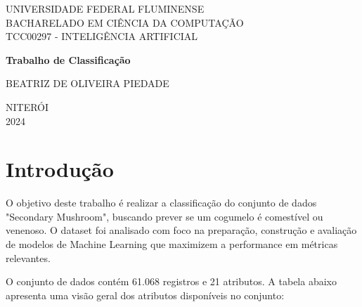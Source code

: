 \documentclass[12pt,a4paper]{article}
\begin{document}
	
\begin{titlepage}
	\centering
	\vspace{2cm}
	
	{UNIVERSIDADE FEDERAL FLUMINENSE} \\ [0.1cm]
	{BACHARELADO EM CIÊNCIA DA COMPUTAÇÃO} \\ [0.1cm]
	{TCC00297 - INTELIGÊNCIA ARTIFICIAL}
	
	\vfill
	
	{\Large \bfseries Trabalho de Classificação}
	
	\vfill
	
	{BEATRIZ DE OLIVEIRA PIEDADE}
	
	\vfill
	{NITERÓI} \\
	{2024}
\end{titlepage}

\tableofcontents

\newpage
\section{Introdução} 

\quad\space O objetivo deste trabalho é realizar a classificação do conjunto de dados "Secondary Mushroom", buscando prever se um cogumelo é comestível ou venenoso. O dataset foi analisado com foco na preparação, construção e avaliação de modelos de Machine Learning que maximizem a performance em métricas relevantes.

O conjunto de dados contém 61.068 registros e 21 atributos. A tabela abaixo apresenta uma visão geral dos atributos disponíveis no conjunto:
\end{document}
